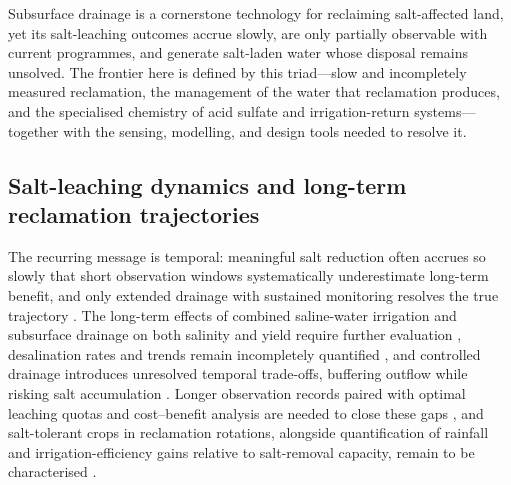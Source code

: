 Subsurface drainage is a cornerstone technology for reclaiming salt-affected
land, yet its salt-leaching outcomes accrue slowly, are only partially
observable with current programmes, and generate salt-laden water whose disposal
remains unsolved. The frontier here is defined by this triad---slow and
incompletely measured reclamation, the management of the water that reclamation
produces, and the specialised chemistry of acid sulfate and irrigation-return
systems---together with the sensing, modelling, and design tools needed to
resolve it.

\subsection{Salt-leaching dynamics and long-term reclamation trajectories}

The recurring message is temporal: meaningful salt reduction often accrues so
slowly that short observation windows systematically underestimate long-term
benefit, and only extended drainage with sustained monitoring resolves the true
trajectory \parencite{Almen2021,Daigh2025}. The long-term effects of combined
saline-water irrigation and subsurface drainage on both salinity and yield
require further evaluation \parencite{Feng2017,Feng2021}, desalination rates and
trends remain incompletely quantified \parencite{Guo2024b,Yao2024}, and
controlled drainage introduces unresolved temporal trade-offs, buffering
outflow while risking salt accumulation
\parencite{Jouni2018,Lu2019,Islam2025,Heng2021}. Longer observation records
paired with optimal leaching quotas and cost--benefit analysis are needed to
close these gaps \parencite{Guo2025}, and salt-tolerant crops in reclamation
rotations, alongside quantification of rainfall and irrigation-efficiency gains
relative to salt-removal capacity, remain to be characterised
\parencite{Qadir2001,Castanheira2010}.

